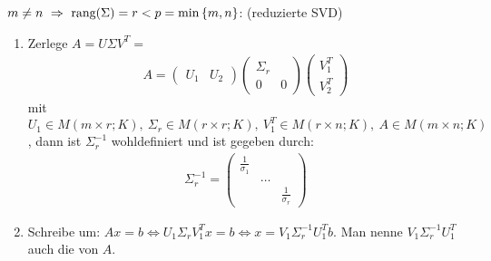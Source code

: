 \underline{$m \neq n \ \Rightarrow \ \text{rang}(\Sigma) = r < p = \min \left\{ m,n \right\}$}:
(reduzierte SVD)
\begin{enumerate}
    \item Zerlege $A = U \Sigma V^T =$
        \begin{align*}
            A=
            \begin{pmatrix} U_1 &  U_2 \end{pmatrix}
            \begin{pmatrix}
                \Sigma_r & \\ 0 & 0
            \end{pmatrix}
            \begin{pmatrix}
                V_1^T \\ V_2^T
            \end{pmatrix}
        \end{align*}
        mit $U_1 \in M(m \times r ; K), \ \Sigma_r \in M(r \times r; K), \ V_1^T \in M(r \times n ; K),
        \ A \in M(m \times n;K)$, dann ist $\Sigma_r^{-1}$ wohldefiniert und ist gegeben durch:
        \begin{align*}
            \Sigma_r^{-1} = \begin{pmatrix}
                \frac{1}{\sigma_1} & & \\
                & \dots & \\
                & & \frac{1}{\sigma_r}
            \end{pmatrix}
        \end{align*}
    \item Schreibe um: $Ax=b \Leftrightarrow U_1 \Sigma_r V_1^T x = b \Leftrightarrow
        x = V_1 \Sigma_r^{-1} U_1^T b$. Man nenne $V_1 \Sigma_r^{-1} U_1^T$ auch die
         von $A$.
\end{enumerate}

\vspace{1\baselineskip}

\underline{}

\vspace{1\baselineskip}


\vspace{1\baselineskip}


